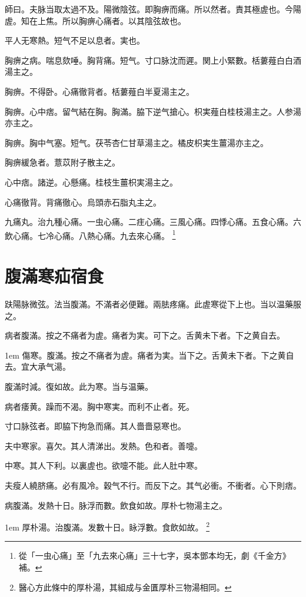 師曰。夫脉当取太過不及。陽微陰弦。即胸痹而痛。所以然者。責其極虗也。今陽虗。知在上焦。所以胸痹心痛者。以其陰弦故也。

平人无寒熱。短气不足以息者。実也。

胸痹之病。喘息欬唾。胸背痛。短气。寸口脉沈而遲。関上小緊數。栝蔞薤白白酒湯主之。

胸痹。不得卧。心痛徹背者。栝蔞薤白半夏湯主之。

胸痹。心中痞。留气結在胸。胸滿。脇下逆{\khaaitp 气}搶心。枳実薤白桂枝湯主之。人参湯亦主之。

胸痹。胸中气塞。短气。茯苓杏仁甘草湯主之。橘{\khaaitp 皮}枳{\khaaitp 実生}薑湯亦主之。

胸痹緩急者。薏苡附子散主之。

心中痞。諸逆。心懸痛。桂枝生薑枳実湯主之。

心痛徹背。背痛徹心。烏頭赤石脂丸主之。

九痛丸。治九種心痛。{\khaaitp 一虫心痛。二疰心痛。三風心痛。四悸心痛。五食心痛。六飲心痛。七冷心痛。八熱心痛。九去來心痛。}
	\footnote{
		從「一虫心痛」至「九去來心痛」三十七字，吳本鄧本均无，劇《千金方》補。
	}

\chapter{腹滿寒疝宿食}

趺陽脉微弦。法当腹滿。不滿者必便難。兩胠疼痛。此虗寒從下上也。当以温藥服之。

病者腹滿。按之不痛{\khaaitp 者}为虗。痛者为実。可下之。舌黄未下者。下之黄自去。

\hangindent 1em
傷寒。腹滿。按之不痛者为虗。痛者为実。当下之。舌黄未下者。下之黄自去。宜大承气湯。{\yuhan}

腹滿时減。復如故。此为寒。当与温藥。

病者痿黄。躁而不渴。胸中寒実。而利不止者。死。

寸口脉弦者。即脇下拘急而痛。其人嗇嗇惡寒也。

夫中寒家。喜欠。其人清涕出。发熱。色和者。善嚏。

中寒。其人下利。以裏虗也。欲嚏不能。此人肚中寒。

夫瘦人繞脐痛。必有風冷。穀气不行。而反下之。其气必衝。不衝者。心下則痞。

病腹滿。发熱十日。脉浮而數。飲食如故。厚朴七物湯主之。


\hangindent 1em
厚朴湯。治腹滿。发數十日。眿浮數。食飲如故。{\yixin}
	\footnote{醫心方此條中的厚朴湯，其組成与金匱厚朴三物湯相同。}

